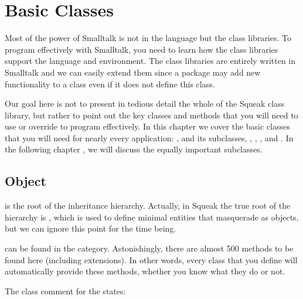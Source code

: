 \documentclass[a4paper,10pt,twoside]{book}
\begin{document}
	\renewcommand{\nnbb}[2]{} %
	\sloppy
\fi
\chapter{Basic Classes}
\label{cha:basic}

Most of the power of Smalltalk is not in the language but the class libraries.
To program effectively with Smalltalk, you need to learn how the class libraries support the language and environment.
The class libraries are entirely written in Smalltalk and we can easily extend them since a package may add new functionality to a class even if it does not define this class. 

Our goal here is not to present in tedious detail the whole of the Squeak class library, but rather to point out the key classes and methods that you will need to use or override to program effectively.
In this chapter we cover the basic classes that you will need for nearly every application: ,  and its subclasses, , , , and . 
In the following chapter , we will discuss the equally important  subclasses.


\section{Object}
 is the root of the inheritance hierarchy.
Actually, in Squeak the true root of the hierarchy is , which is used to define minimal entities that masquerade as objects, but we can ignore this point for the time being.

 can be found in the  category.
Astonishingly, there are almost 500 methods to be found here (including extensions).
In other words, every class that you define will automatically provide these methods, whether you know what they do or not.

The class comment for the  states:
\end{document}

